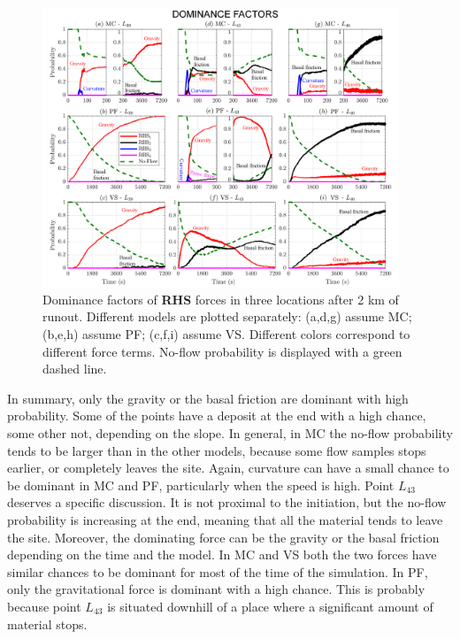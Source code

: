 \documentclass{article}
\begin{document}
\begin{figure}[H]
         \centering
        \includegraphics[width=0.95\textwidth]{figures/Colima/Pr2_total.png}
        \caption{Dominance factors of \textbf{RHS} forces in three locations after 2 km of runout. Different models are plotted separately: (a,d,g) assume MC; (b,e,h) assume PF; (c,f,i) assume VS. Different colors correspond to different force terms. No-flow probability is displayed with a green dashed line.}
        \label{fig:Colima-Pr2}
\end{figure}
In summary, only the gravity or the basal friction are dominant with high probability. Some of the points have a deposit at the end with a high chance, some other not, depending on the slope. In general, in MC the no-flow probability tends to be larger than in the other models, because some flow samples stops earlier, or completely leaves the site. Again, curvature can have a small chance to be dominant in MC and PF, particularly when the speed is high. Point $L_{43}$ deserves a specific discussion. It is not proximal to the initiation, but the no-flow probability is increasing at the end, meaning that all the material tends to leave the site. Moreover, the dominating force can be the gravity or the basal friction depending on the time and the model. In MC and VS both the two forces have similar chances to be dominant for  most of the time of the simulation. In PF, only the gravitational force is dominant with a high chance. This is probably because point $L_{43}$ is situated downhill of a place where a significant amount of material stops.
\end{document}
